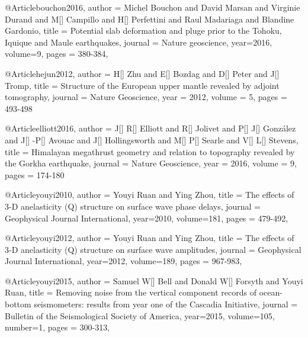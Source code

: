 @Article{bouchon2016,
  author =	 {Michel Bouchon and David Marsan and Virginie Durand and M[] Campillo and H[] Perfettini and Raul Madariaga and Blandine Gardonio},
  title =	 {Potential slab deformation and pluge prior to the {T}ohoku, {I}quique and {M}aule earthquakes},
  journal =	 {Nature geoscience},
  year=2016,
  volume=9,
  pages =	 {380-384},
}

@Article{hejun2012,
  author = 	 {H[] Zhu and E[] Bozdag and D[] Peter and J[] Tromp},
  title = 	 {Structure of the European upper mantle revealed by adjoint tomography},
  journal = 	 {Nature Geoscience},
  year = 	 2012,
  volume = 5,
  pages =	 {493-498}
}

@Article{elliott2016,
  author = 	 {J[] R[] Elliott and R[] Jolivet and P[] J[] Gonz\'{a}lez and J[] -P[] Avouac and J[] Hollingsworth and M[] P[] Searle and V[] L[] Stevens},
  title = 	 {Himalayan megathrust geometry and relation to topography revealed by the {G}orkha earthquake},
  journal = 	 {Nature Geoscience},
  year = 	 2016,
  volume = 9,
  pages =	 {174-180}
}

@Article{youyi2010,
  author =	 {Youyi Ruan and Ying Zhou},
  title =	 {The effects of 3-D anelasticity (Q) structure on surface wave phase delays},
  journal =	 {Geophysical Journal International},
  year=2010,
  volume=181,
  pages =	 {479-492},
}

@Article{youyi2012,
  author =	 {Youyi Ruan and Ying Zhou},
  title =	 {The effects of 3-D anelasticity (Q) structure on surface wave amplitudes},
  journal =	 {Geophysical Journal International},
  year=2012,
  volume=189,
  pages =	 {967-983},
}

@Article{youyi2015,
  author =	 {Samuel W[] Bell and Donald W[] Forsyth and Youyi Ruan},
  title =	 {Removing noise from the vertical component records of ocean-bottom seismometers: results from year one of the Cascadia Initiative},
  journal =	 {Bulletin of the Seismological Society of America},
  year=2015,
  volume=105,
  number=1,
  pages =	 {300-313},
}

